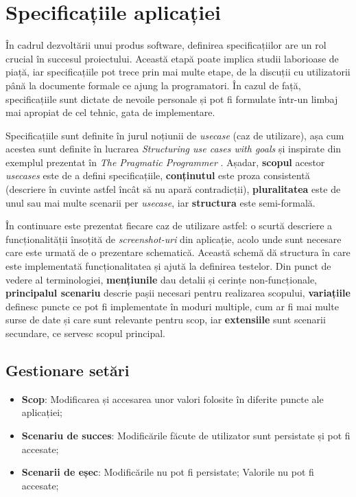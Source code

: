 \chapter{Specificațiile aplicației}\label{specs}

În cadrul dezvoltării unui produs software, definirea specificațiilor are un rol crucial în succesul proiectului. Această etapă poate implica studii laborioase de piață, iar specificațiile pot trece prin mai multe etape, de la discuții cu utilizatorii până la documente formale ce ajung la programatori. În cazul de față, specificațiile sunt dictate de nevoile personale și pot fi formulate într-un limbaj mai apropiat de cel tehnic, gata de implementare.

Specificațiile sunt definite în jurul noțiunii de \emph{usecase} (caz de utilizare), așa cum acestea sunt definite în lucrarea \emph{Structuring use cases with goals} \cite{cockburn1997structuring} și inspirate din exemplul prezentat în \emph{The Pragmatic Programmer} \cite{Hunt:2000:PPJ:320326}. Așadar, \textbf{scopul} acestor \emph{usecases} este de a defini specificațiile, \textbf{conținutul} este proza consistentă (descriere în cuvinte astfel încât să nu apară contradicții), \textbf{pluralitatea} este de unul sau mai multe scenarii per \emph{usecase}, iar \textbf{structura} este semi-formală.

În continuare este prezentat fiecare caz de utilizare astfel: o scurtă descriere a funcționalității însoțită de \emph{screenshot-uri} din aplicație, acolo unde sunt necesare care este urmată de o prezentare schematică. Această schemă dă structura în care este implementată funcționalitatea și ajută la definirea testelor. Din punct de vedere al terminologiei, \textbf{mențiunile} dau detalii și cerințe non-funcționale, \textbf{principalul scenariu} descrie pașii necesari pentru realizarea scopului, \textbf{variațiile} definesc puncte ce pot fi implementate în moduri multiple, cum ar fi mai multe surse de date și care sunt relevante pentru scop, iar \textbf{extensiile} sunt scenarii secundare, ce servesc scopul principal.




\section{Gestionare setări}\label{spec:setari}

\begin{itemize}
\item
  \textbf{Scop}: Modificarea și accesarea unor valori folosite în diferite puncte ale aplicației;
\item
  \textbf{Scenariu de succes}: Modificările făcute de utilizator sunt persistate și pot fi accesate;
\item
  \textbf{Scenarii de eșec}: Modificările nu pot fi persistate; Valorile nu pot fi accesate;
\end{itemize}

